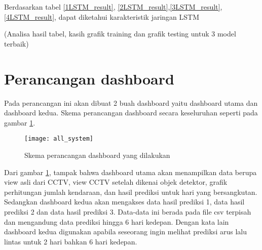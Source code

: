 \documentclass[../thesis.tex]{subfiles}
\begin{document}
Berdasarkan tabel \ref{1LSTM_result}, \ref{2LSTM_result},\ref{3LSTM_result}, \ref{4LSTM_result}, dapat diketahui karakteristik jaringan LSTM

(Analisa hasil tabel, kasih grafik training dan grafik testing untuk 3 model terbaik)

\section{Perancangan dashboard}
Pada perancangan ini akan dibuat 2 buah dashboard yaitu dashboard utama dan dashboard kedua. Skema perancangan dashboard secara keseluruhan seperti pada gambar \ref{all_system}.
\begin{figure}[htp]
	\centering
	\texttt{[image: all\_system]}
	\caption{Skema perancangan dashboard yang dilakukan}
	\label{all_system}
\end{figure}

Dari gambar \ref{all_system}, tampak bahwa dashboard utama akan menampilkan data berupa view asli dari CCTV, view CCTV setelah dikenai objek detektor, grafik perhitungan jumlah kendaraan, dan hasil prediksi untuk hari yang bersangkutan.
Sedangkan dashboard kedua akan mengakses data hasil prediksi 1, data hasil prediksi 2 dan data hasil prediksi 3. Data-data ini berada pada file csv terpisah dan mengandung data prediksi hingga 6 hari kedepan. Dengan kata lain dashboard kedua digunakan
apabila seseorang ingin melihat prediksi arus lalu lintas untuk 2 hari bahkan 6 hari kedepan.
\end{document}
